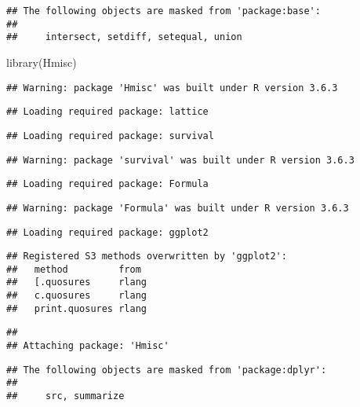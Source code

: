 \documentclass[]{article}
\newenvironment{Shaded}{\begin{snugshade}}{\end{snugshade}}
\newcommand{\FunctionTok}[1]{\textcolor[rgb]{0.00,0.00,0.00}{#1}}
\newcommand{\NormalTok}[1]{#1}
\begin{document}
\begin{verbatim}
## The following objects are masked from 'package:base':
## 
##     intersect, setdiff, setequal, union
\end{verbatim}

\begin{Shaded}
\begin{Highlighting}[]
\FunctionTok{library}\NormalTok{(Hmisc)}
\end{Highlighting}
\end{Shaded}

\begin{verbatim}
## Warning: package 'Hmisc' was built under R version 3.6.3
\end{verbatim}

\begin{verbatim}
## Loading required package: lattice
\end{verbatim}

\begin{verbatim}
## Loading required package: survival
\end{verbatim}

\begin{verbatim}
## Warning: package 'survival' was built under R version 3.6.3
\end{verbatim}

\begin{verbatim}
## Loading required package: Formula
\end{verbatim}

\begin{verbatim}
## Warning: package 'Formula' was built under R version 3.6.3
\end{verbatim}

\begin{verbatim}
## Loading required package: ggplot2
\end{verbatim}

\begin{verbatim}
## Registered S3 methods overwritten by 'ggplot2':
##   method         from 
##   [.quosures     rlang
##   c.quosures     rlang
##   print.quosures rlang
\end{verbatim}

\begin{verbatim}
## 
## Attaching package: 'Hmisc'
\end{verbatim}

\begin{verbatim}
## The following objects are masked from 'package:dplyr':
## 
##     src, summarize
\end{verbatim}
\end{document}
